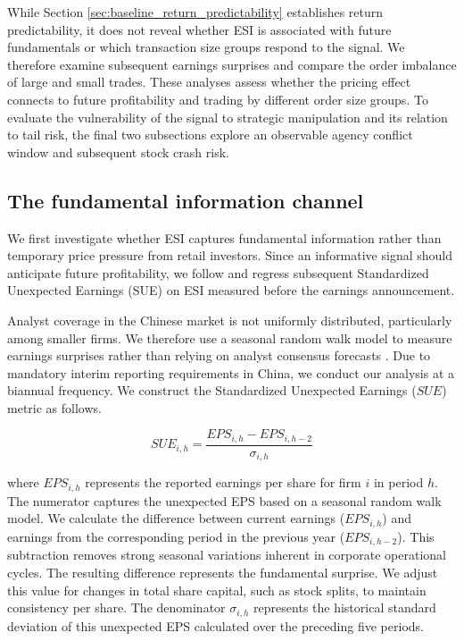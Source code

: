\documentclass[12pt]{article}
\begin{document}
While Section \ref{sec:baseline_return_predictability} establishes return predictability, it does not reveal whether ESI is associated with future fundamentals or which transaction size groups respond to the signal. We therefore examine subsequent earnings surprises and compare the order imbalance of large and small trades. These analyses assess whether the pricing effect connects to future profitability and trading by different order size groups. To evaluate the vulnerability of the signal to strategic manipulation and its relation to tail risk, the final two subsections explore an observable agency conflict window and subsequent stock crash risk.

\subsection{The fundamental information channel}\label{sec:fundamental_channel}

We first investigate whether ESI captures fundamental information rather than temporary price pressure from retail investors. Since an informative signal should anticipate future profitability, we follow \citet{chen2014} and regress subsequent Standardized Unexpected Earnings (SUE) on ESI measured before the earnings announcement.

Analyst coverage in the Chinese market is not uniformly distributed, particularly among smaller firms. We therefore use a seasonal random walk model to measure earnings surprises rather than relying on analyst consensus forecasts \citep{bernard1989post}. Due to mandatory interim reporting requirements in China, we conduct our analysis at a biannual frequency. We construct the Standardized Unexpected Earnings ($SUE$) metric as follows.

\begin{equation}
    SUE_{i,h} = \frac{EPS_{i,h} - EPS_{i,h-2}}{\sigma_{i,h}}
\end{equation}

\noindent where $EPS_{i,h}$ represents the reported earnings per share for firm $i$ in period $h$. The numerator captures the unexpected EPS based on a seasonal random walk model. We calculate the difference between current earnings ($EPS_{i,h}$) and earnings from the corresponding period in the previous year ($EPS_{i,h-2}$). This subtraction removes strong seasonal variations inherent in corporate operational cycles. The resulting difference represents the fundamental surprise. We adjust this value for changes in total share capital, such as stock splits, to maintain consistency per share. The denominator $\sigma_{i,h}$ represents the historical standard deviation of this unexpected EPS calculated over the preceding five periods.
\end{document}

